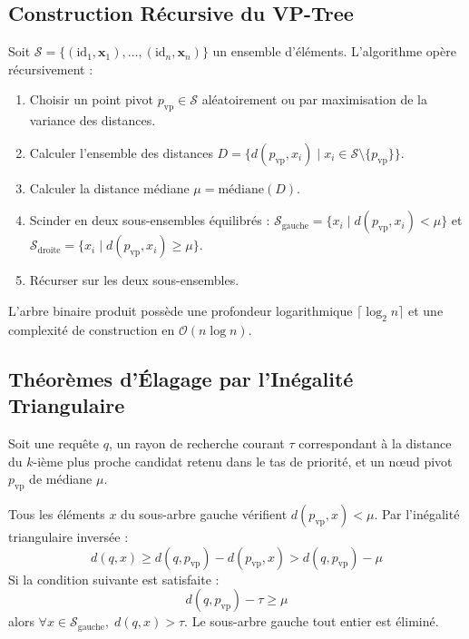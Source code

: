 \subsection{Construction Récursive du VP-Tree}
Soit $\mathcal{S} = \{ (\text{id}_1, \mathbf{x}_1), \dots, (\text{id}_n, \mathbf{x}_n) \}$ un ensemble d'éléments. L'algorithme opère récursivement :
\begin{enumerate}[nosep]
    \item Choisir un point pivot $p_{\text{vp}} \in \mathcal{S}$ aléatoirement ou par maximisation de la variance des distances.
    \item Calculer l'ensemble des distances $D = \{ d(p_{\text{vp}}, x_i) \mid x_i \in \mathcal{S} \setminus \{p_{\text{vp}}\} \}$.
    \item Calculer la distance médiane $\mu = \text{médiane}(D)$.
    \item Scinder en deux sous-ensembles équilibrés : $\mathcal{S}_{\text{gauche}} = \{ x_i \mid d(p_{\text{vp}}, x_i) < \mu \}$ et $\mathcal{S}_{\text{droite}} = \{ x_i \mid d(p_{\text{vp}}, x_i) \ge \mu \}$.
    \item Récurser sur les deux sous-ensembles.
\end{enumerate}
L'arbre binaire produit possède une profondeur logarithmique $\lceil \log_2 n \rceil$ et une complexité de construction en $\mathcal{O}(n \log n)$.

\subsection{Théorèmes d'Élagage par l'Inégalité Triangulaire}
Soit une requête $q$, un rayon de recherche courant $\tau$ correspondant à la distance du $k$-ième plus proche candidat retenu dans le tas de priorité, et un nœud pivot $p_{\text{vp}}$ de médiane $\mu$.

\begin{theorem}
Tous les éléments $x$ du sous-arbre gauche vérifient $d(p_{\text{vp}}, x) < \mu$. Par l'inégalité triangulaire inversée :
\begin{equation}
    d(q, x) \ge d(q, p_{\text{vp}}) - d(p_{\text{vp}}, x) > d(q, p_{\text{vp}}) - \mu
\end{equation}
Si la condition suivante est satisfaite :
\begin{equation}
    d(q, p_{\text{vp}}) - \tau \ge \mu
\end{equation}
alors $\forall x \in \mathcal{S}_{\text{gauche}}, \; d(q, x) > \tau$. Le sous-arbre gauche tout entier est éliminé.
\end{theorem}

